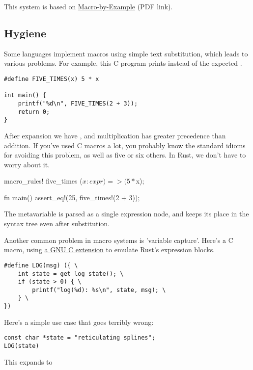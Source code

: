 \blank

This system is based on \href{https://www.cs.indiana.edu/ftp/techreports/TR206.pdf}{Macro-by-Example} (PDF link).

\subsection*{Hygiene}

Some languages implement macros using simple text substitution, which leads to various problems. For example, this C program prints 
 instead of the expected .

\begin{verbatim}
#define FIVE_TIMES(x) 5 * x

int main() {
    printf("%d\n", FIVE_TIMES(2 + 3));
    return 0;
}
\end{verbatim}

After expansion we have , and multiplication has greater precedence than addition. If you've used C macros a lot, you 
probably know the standard idioms for avoiding this problem, as well as five or six others. In Rust, we don't have to worry about it.

\begin{rustc}
macro_rules! five_times {
    ($x:expr) => (5 * $x);
}

fn main() {
    assert_eq!(25, five_times!(2 + 3));
}
\end{rustc}

The metavariable  is parsed as a single expression node, and keeps its place in the syntax tree even after substitution.

\blank

Another common problem in macro systems is 'variable capture'. Here's a C macro, using 
\href{https://gcc.gnu.org/onlinedocs/gcc/Statement-Exprs.html}{a GNU C extension} to emulate Rust's expression blocks.

\begin{verbatim}
#define LOG(msg) ({ \
    int state = get_log_state(); \
    if (state > 0) { \
        printf("log(%d): %s\n", state, msg); \
    } \
})
\end{verbatim}

Here's a simple use case that goes terribly wrong:

\begin{verbatim}
const char *state = "reticulating splines";
LOG(state)
\end{verbatim}

This expands to

